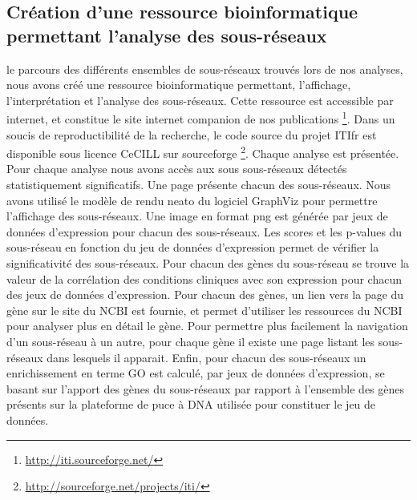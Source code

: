 		\subsection{\textcolor{mygreen}{Création d'une ressource bioinformatique permettant l'analyse des sous-réseaux}}
			 le parcours des différents ensembles de sous-réseaux trouvés lors de nos analyses, nous avons créé une ressource bioinformatique permettant, l'affichage, l'interprétation et l'analyse des sous-réseaux.
			Cette ressource est accessible par internet, et constitue le site internet companion de nos publications \footnote{\url{http://iti.sourceforge.net/}}.
			Dans un soucis de reproductibilité de la recherche, le code source du projet \ac{ITIfr} est disponible sous licence CeCILL sur sourceforge \footnote{\url{http://sourceforge.net/projects/iti/}}.
			Chaque analyse est présentée.
			Pour chaque analyse nous avons accès aux sous sous-réseaux détectés statistiquement significatifs.
			Une page présente chacun des sous-réseaux.
			Nous avons utilisé le modèle de rendu neato du logiciel GraphViz pour permettre l'affichage des sous-réseaux.
			Une image en format png est générée par jeux de données d'expression pour chacun des sous-réseaux.
			Les scores et les p-values du sous-réseau en fonction du jeu de données d'expression permet de vérifier la significativité des sous-réseaux.
			Pour chacun des gènes du sous-réseau se trouve la valeur de la corrélation des conditions cliniques avec son expression pour chacun des jeux de données d'expression.
			Pour chacun des gènes, un lien vers la page du gène sur le site du NCBI est fournie, et permet d'utiliser les ressources du NCBI pour analyser plus en détail le gène.
			Pour permettre plus facilement la navigation d'un sous-réseau à un autre, pour chaque gène il existe une page listant les sous-réseaux dans lesquels il apparait.
			Enfin, pour chacun des sous-réseaux un enrichissement en terme GO est calculé, par jeux de données d'expression, se basant sur l'apport des gènes du sous-réseaux par rapport à l'ensemble des gènes présents sur la plateforme de puce à \acs{DNA} utilisée pour constituer le jeu de données.

